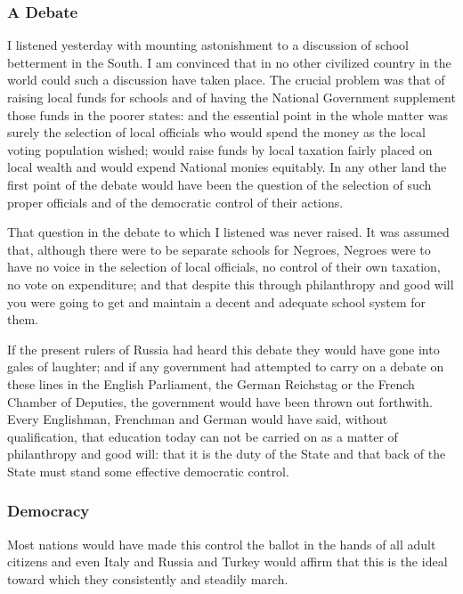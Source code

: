 \documentclass[letterpaper,10pt,english]{jupyterBook}
\begin{document}
\subsubsection{A Debate}
\label{\detokenize{Volumes/36/05/negro_citizen:a-debate}}
\sphinxAtStartPar
I listened yesterday with mounting astonishment to a discussion of school betterment in the South. I am convinced that in no other civilized country in the world could such a discussion have taken place. The crucial problem was that of raising local funds for schools and of having the National Government supplement those funds in the poorer states: and the essential point in the whole matter was surely the selection of local officials who would spend the money as the local voting population wished; would raise funds by local taxation fairly placed on local wealth and would expend National monies equitably. In any other land the first point of the debate would have been the question of the selection of such proper officials and of the democratic control of their actions.

\sphinxAtStartPar
That question in the debate to which I listened was never raised. It was assumed that, although there were to be separate schools for Negroes, Negroes were to have no voice in the selection of local officials, no control of their own taxation, no vote on expenditure; and that despite this through philanthropy and good will you were going to get and maintain a decent and adequate school system for them.

\sphinxAtStartPar
If the present rulers of Russia had heard this debate they would have gone into gales of laughter; and if any government had attempted to carry on a debate on these lines in the English Parliament, the German Reichstag or the French Chamber of Deputies, the government would have been thrown out forthwith. Every Englishman, Frenchman and German would have said, without qualification, that education today can not be carried on as a matter of philanthropy and good will: that it is the duty of the State and that back of the State must stand some effective democratic control.


\subsubsection{Democracy}
\label{\detokenize{Volumes/36/05/negro_citizen:democracy}}
\sphinxAtStartPar
Most nations would have made this control the ballot in the hands of all adult citizens and even Italy and Russia and Turkey would affirm that this is the ideal toward which they consistently and steadily march.
\end{document}

